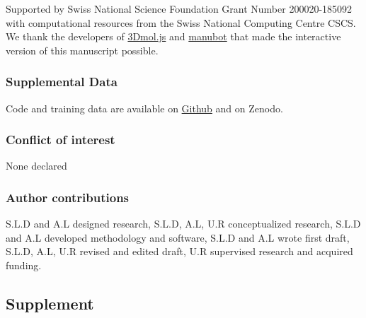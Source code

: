 \documentclass[ lineno,
  9pt]{elife}
\begin{document}
Supported by Swiss National Science Foundation Grant Number 200020-185092 with computational resources from the Swiss National Computing Centre CSCS.
We thank the developers of \href{https://3dmol.csb.pitt.edu/}{3Dmol.js} and \href{https://manubot.org/}{manubot} that made the interactive version of this manuscript possible.

\hypertarget{extradata}{%
\subsubsection{Supplemental Data}\label{extradata}}
Code and training data are available on \href{https://github.com/lcbc-epfl/metal-site-prediction}{Github} and on Zenodo.


\hypertarget{conflict-of-interest}{%
\subsubsection{Conflict of interest}\label{conflict-of-interest}}

None declared

\hypertarget{author-contributions}{%
\subsubsection{Author contributions}\label{author-contributions}}

S.L.D and A.L designed research, S.L.D, A.L, U.R conceptualized research, S.L.D and A.L developed methodology and software, S.L.D and A.L wrote first draft, S.L.D, A.L, U.R revised and edited draft, U.R supervised research and acquired funding.



\hypertarget{supplement}{%
\subsection{Supplement}\label{supplement}}
\end{document}

